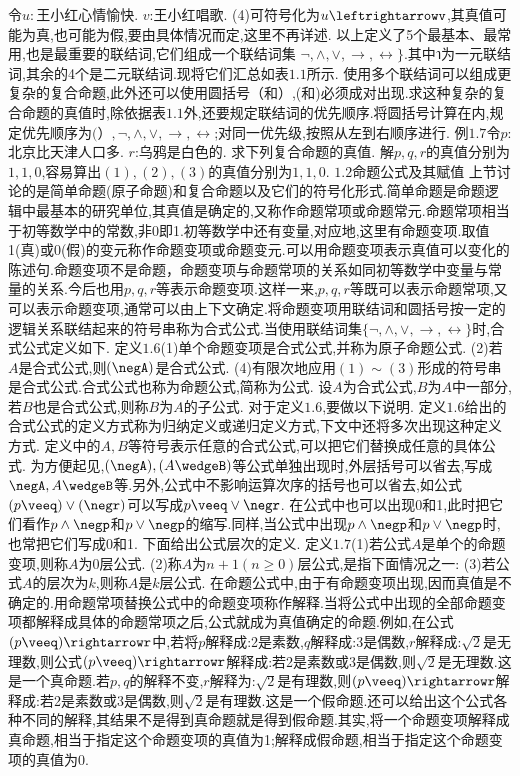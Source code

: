 {令$u:$王小红心情愉快.
$v$:王小红唱歌.
(4)可符号化为$u\leftrightarrowv$,其真值可能为真,也可能为假,要由具体情况而定,这里不再详述.
以上定义了5个最基本、最常用,也是最重要的联结词,它们组成一个联结词集
$\neg,\wedge,\vee,\rightarrow,\leftrightarrow\}$.其中า为一元联结词,其余的4个是二元联结词.现将它们汇总如表$1.1$所示.
使用多个联结词可以组成更复杂的复合命题,此外还可以使用圆括号（和）,(和)必须成对出现.求这种复杂的复合命题的真值时,除依据表$1.1$外,还要规定联结词的优先顺序.将圆括号计算在内,规定优先顺序为$(）,\neg,\wedge,\vee,\rightarrow,\leftrightarrow$;对同一优先级,按照从左到右顺序进行.
例$1.7$令$p$:北京比天津人口多.
$r$:乌鸦是白色的.
求下列复合命题的真值.
解$p,q,r$的真值分别为$1,1,0$,容易算出$(1),(2),(3)$的真值分别为$1,1,0$.
{$1.2$命题公式及其赋值}
上节讨论的是简单命题(原子命题)和复合命题以及它们的符号化形式.简单命题是命题逻辑中最基本的研究单位,其真值是确定的,又称作命题常项或命题常元.命题常项相当于初等数学中的常数,非0即1.初等数学中还有变量,对应地,这里有命题变项.取值1(真)或0(假)的变元称作命题变项或命题变元.可以用命题变项表示真值可以变化的陈述句.命题变项不是命题，命题变项与命题常项的关系如同初等数学中变量与常量的关系.今后也用$p,q,r$等表示命题变项.这样一来,$p,q,r$等既可以表示命题常项,又可以表示命题变项,通常可以由上下文确定.将命题变项用联结词和圆括号按一定的逻辑关系联结起来的符号串称为合式公式.当使用联结词集$\{\neg,\wedge,\vee,\rightarrow,\leftrightarrow\}$时,合式公式定义如下.
定义$1.6$(1)单个命题变项是合式公式,并称为原子命题公式.
(2)若$A$是合式公式,则$(\negA)$是合式公式.
(4)有限次地应用$(1)\sim(3)$形成的符号串是合式公式.合式公式也称为命题公式,简称为公式.
设$A$为合式公式,$B$为$A$中一部分,若$B$也是合式公式,则称$B$为$A$的子公式.
对于定义$1.6$,要做以下说明.
定义$1.6$给出的合式公式的定义方式称为归纳定义或递归定义方式,下文中还将多次出现这种定义方式.
定义中的$A,B$等符号表示任意的合式公式,可以把它们替换成任意的具体公式.
为方便起见,$(\negA),(A\wedgeB)$等公式单独出现时,外层括号可以省去,写成$\negA,A\wedgeB$等.另外,公式中不影响运算次序的括号也可以省去,如公式$(p\veeq)\vee(\negr)$可以写成$p\veeq\vee\negr$.
在公式中也可以出现0和1,此时把它们看作$p\wedge\negp$和$p\vee\negp$的缩写.同样,当公式中出现$p\wedge\negp$和$p\vee\negp$时,也常把它们写成0和1.
下面给出公式层次的定义.
定义$1.7$(1)若公式$A$是单个的命题变项,则称$A$为0层公式.
(2)称$A$为$n+1(n\geqslant0)$层公式,是指下面情况之一:
(3)若公式$A$的层次为$k$,则称$A$是$k$层公式.
在命题公式中,由于有命题变项出现,因而真值是不确定的.用命题常项替换公式中的命题变项称作解释.当将公式中出现的全部命题变项都解释成具体的命题常项之后,公式就成为真值确定的命题.例如,在公式$(p\veeq)\rightarrowr$中,若将$p$解释成:2是素数,$q$解释成:3是偶数,$r$解释成:$\sqrt{2}$是无理数,则公式$(p\veeq)\rightarrowr$解释成:若2是素数或3是偶数,则$\sqrt{2}$是无理数.这是一个真命题.若$p,q$的解释不变,$r$解释为:$\sqrt{2}$是有理数,则$(p\veeq)\rightarrowr$解释成:若2是素数或3是偶数,则$\sqrt{2}$是有理数.这是一个假命题.还可以给出这个公式各种不同的解释,其结果不是得到真命题就是得到假命题.其实,将一个命题变项解释成真命题,相当于指定这个命题变项的真值为1;解释成假命题,相当于指定这个命题变项的真值为0.
}
